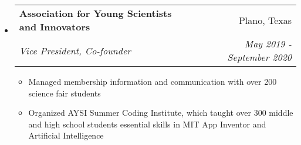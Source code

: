 \documentclass[letterpaper,11pt]{article}
\makeatletter
\newcommand{\resitem}[1]{\item #1 \vspace{-3pt}}
\newcommand{\ressubheading}[4]{
	\begin{tabular*}{7.0in}{l@{\extracolsep{\fill}}r}
			#1 & #2 \\
			\textit{#3} & \textit{#4}
	\end{tabular*}\vspace{-6pt}
}
\makeatother
\begin{document}
\begin{itemize}[leftmargin=*]
	\item
		\ressubheading{\textbf{Association for Young Scientists and Innovators}}{Plano, Texas}{Vice President, Co-founder}{May 2019 - September 2020}
			\begin{itemize}
				\resitem{Managed membership information and communication with over 200 science fair students}
				\resitem{Organized AYSI Summer Coding Institute, which taught over 300 middle and high school students essential skills in MIT App Inventor and Artificial Intelligence}
			\end{itemize}






\end{itemize}
\end{document}
